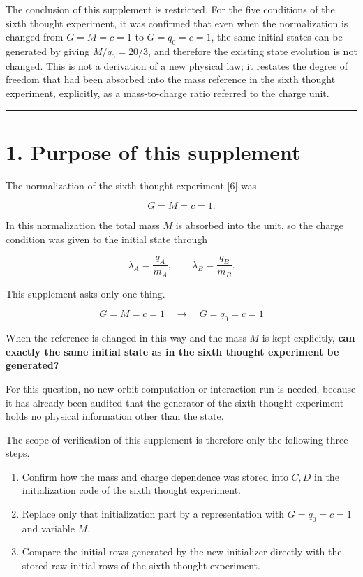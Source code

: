 \documentclass[
  a4paper,
]{article}
\providecommand{\tightlist}{%
  \setlength{\itemsep}{0pt}\setlength{\parskip}{0pt}}
\begin{document}
The conclusion of this supplement is restricted. For the five conditions
of the sixth thought experiment, it was confirmed that even when the
normalization is changed from \(G=M=c=1\) to \(G=q_0=c=1\), the same
initial states can be generated by giving \(M/q_0=20/3\), and therefore
the existing state evolution is not changed. This is not a derivation of
a new physical law; it restates the degree of freedom that had been
absorbed into the mass reference in the sixth thought experiment,
explicitly, as a mass-to-charge ratio referred to the charge unit.

\begin{center}\rule{0.5\linewidth}{0.5pt}\end{center}

\section{1. Purpose of this
supplement}\label{purpose-of-this-supplement}

The normalization of the sixth thought experiment {[}6{]} was

\[
G=M=c=1.
\]

In this normalization the total mass \(M\) is absorbed into the unit, so
the charge condition was given to the initial state through

\[
\lambda_A=\frac{q_A}{m_A},\qquad
\lambda_B=\frac{q_B}{m_B}.
\]

This supplement asks only one thing.

\[
\boxed{
G=M=c=1
\quad\longrightarrow\quad
G=q_0=c=1
}
\]

When the reference is changed in this way and the mass \(M\) is kept
explicitly, \textbf{can exactly the same initial state as in the sixth
thought experiment be generated?}

For this question, no new orbit computation or interaction run is
needed, because it has already been audited that the generator of the
sixth thought experiment holds no physical information other than the
state.

The scope of verification of this supplement is therefore only the
following three steps.

\begin{enumerate}
\def\labelenumi{\arabic{enumi}.}
\tightlist
\item
  Confirm how the mass and charge dependence was stored into \(C,D\) in
  the initialization code of the sixth thought experiment.
\item
  Replace only that initialization part by a representation with
  \(G=q_0=c=1\) and variable \(M\).
\item
  Compare the initial rows generated by the new initializer directly
  with the stored raw initial rows of the sixth thought experiment.
\end{enumerate}
\end{document}
